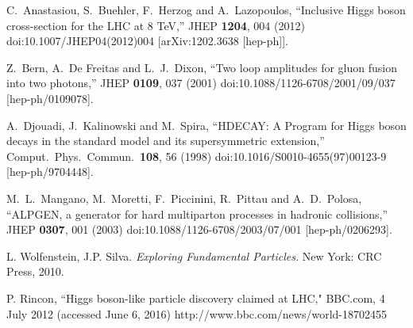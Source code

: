 \documentclass[letter,12pt]{article}
\begin{document}
\begin{thebibliography}{99}
  C.~Anastasiou, S.~Buehler, F.~Herzog and A.~Lazopoulos,
  ``Inclusive Higgs boson cross-section for the LHC at 8 TeV,''
  JHEP {\bf 1204}, 004 (2012)
  doi:10.1007/JHEP04(2012)004
  [arXiv:1202.3638 [hep-ph]].
  
  Z.~Bern, A.~De Freitas and L.~J.~Dixon,
  ``Two loop amplitudes for gluon fusion into two photons,''
  JHEP {\bf 0109}, 037 (2001)
  doi:10.1088/1126-6708/2001/09/037
  [hep-ph/0109078].

  A.~Djouadi, J.~Kalinowski and M.~Spira,
  ``HDECAY: A Program for Higgs boson decays in the standard model and its supersymmetric extension,''
  Comput.\ Phys.\ Commun.\  {\bf 108}, 56 (1998)
  doi:10.1016/S0010-4655(97)00123-9
  [hep-ph/9704448].

  M.~L.~Mangano, M.~Moretti, F.~Piccinini, R.~Pittau and A.~D.~Polosa,
  ``ALPGEN, a generator for hard multiparton processes in hadronic collisions,''
  JHEP {\bf 0307}, 001 (2003)
  doi:10.1088/1126-6708/2003/07/001
  [hep-ph/0206293].
  
  L. Wolfenstein, J.P. Silva. {\it Exploring Fundamental Particles.} New York: CRC Press, 2010.

 P. Rincon, ``Higgs boson-like particle discovery claimed at LHC," BBC.com, 4 July 2012 (accessed June 6, 2016)
 http://www.bbc.com/news/world-18702455
 


  




  
  
  
\end{thebibliography}
\end{document}
